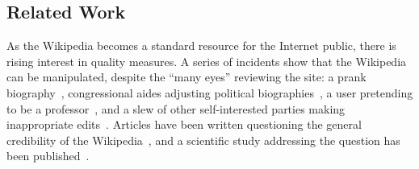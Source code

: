 \subsection{Related Work}

As the Wikipedia becomes a standard resource for the Internet
public, there is rising interest in quality measures.
A series of incidents show that the Wikipedia can be manipulated,
despite the ``many eyes'' reviewing the site:
a prank biography~\cite{Seigenthaler05,NewYorkTimes05a,NewYorkTimes05b},
congressional aides adjusting political
biographies~\cite{TheSun06,NewZelandHerald06,BBC06},
a user pretending to be a professor~\cite{BBC07},
and a slew of other self-interested parties making
inappropriate edits~\cite{Wired07,Wikiscanner07,NPR08}.
Articles have been written questioning the
general credibility of the Wikipedia~\cite{NewYorkTimes06,TheNewYorker06},
and a scientific study addressing the question
has been published~\cite{Giles05}.


